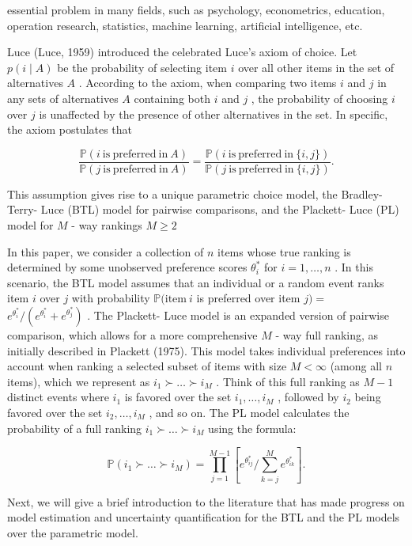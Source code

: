 essential problem in many fields, such as psychology, econometrics,
education, operation research, statistics, machine learning, artificial
intelligence, etc.

Luce (Luce, 1959) introduced the celebrated Luce's axiom of choice. Let
\(p(i\mid A)\) be the probability of selecting item \(i\) over all other
items in the set of alternatives \(A\) . According to the axiom, when
comparing two items \(i\) and \(j\) in any sets of alternatives \(A\)
containing both \(i\) and \(j\) , the probability of choosing \(i\) over
\(j\) is unaffected by the presence of other alternatives in the set. In
specific, the axiom postulates that

\[
\frac{\mathbb{P}(i\mathrm{~is~preferred~in~}A)}{\mathbb{P}(j\mathrm{~is~preferred~in~}A)} = \frac{\mathbb{P}(i\mathrm{~is~preferred~in~}\{i,j\})}{\mathbb{P}(j\mathrm{~is~preferred~in~}\{i,j\})}.
\]

This assumption gives rise to a unique parametric choice model, the
Bradley- Terry- Luce (BTL) model for pairwise comparisons, and the
Plackett- Luce (PL) model for \(M\) - way rankings \(M\geq 2\)

In this paper, we consider a collection of \(n\) items whose true
ranking is determined by some unobserved preference scores
\(\theta_{i}^{*}\) for \(i = 1,\dots ,n\) . In this scenario, the BTL
model assumes that an individual or a random event ranks item \(i\) over
\(j\) with probability \(\mathbb{P}(\mathrm{item}~i\) is preferred over
item \(j) =\) \(e^{\theta_i^*} / (e^{\theta_i^*} + e^{\theta_j^*})\) .
The Plackett- Luce model is an expanded version of pairwise comparison,
which allows for a more comprehensive \(M\) - way full ranking, as
initially described in Plackett (1975). This model takes individual
preferences into account when ranking a selected subset of items with
size \(M< \infty\) (among all \(n\) items), which we represent as
\(i_{1}\succ \dots \succ i_{M}\) . Think of this full ranking as
\(M - 1\) distinct events where \(i_{1}\) is favored over the set
\(i_{1},\ldots ,i_{M}\) , followed by \(i_{2}\) being favored over the
set \(i_{2},\ldots ,i_{M}\) , and so on. The PL model calculates the
probability of a full ranking \(i_{1}\succ \dots \succ i_{M}\) using the
formula:

\[
\mathbb{P}(i_1\succ \dots \succ i_M) = \prod_{j = 1}^{M - 1}\left[e^{\theta_{ij}^*} / \sum_{k = j}^{M}e^{\theta_{ik}^*}\right].
\]

Next, we will give a brief introduction to the literature that has made
progress on model estimation and uncertainty quantification for the BTL
and the PL models over the parametric model.

